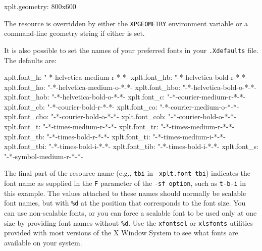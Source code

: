 \documentclass{book}
\begin{document}
\begin{center}
\begin{boxedverbatim}
xplt.geometry: 800x600
\end{boxedverbatim}
\end{center}

The resource is overridden by either the {\tt XPGEOMETRY} environment
variable or a command-line geometry string if either is set.

%
It is also possible to set the names of your preferred fonts in your
{\tt .Xdefaults} file.  The defaults are:

\begin{center}
\begin{boxedverbatim}
xplt.font_h:    "-*-helvetica-medium-r-*-*-%
xplt.font_hb:   "-*-helvetica-bold-r-*-*-%
xplt.font_ho:   "-*-helvetica-medium-o-*-*-%
xplt.font_hbo:  "-*-helvetica-bold-o-*-*-%
xplt.font_hob:  "-*-helvetica-bold-o-*-*-%
xplt.font_c:    "-*-courier-medium-r-*-*-%
xplt.font_cb:   "-*-courier-bold-r-*-*-%
xplt.font_co:   "-*-courier-medium-o-*-*-%
xplt.font_cbo:  "-*-courier-bold-o-*-*-%
xplt.font_cob:  "-*-courier-bold-o-*-*-%
xplt.font_t:    "-*-times-medium-r-*-*-%
xplt.font_tr:   "-*-times-medium-r-*-*-%
xplt.font_tb:   "-*-times-bold-r-*-*-%
xplt.font_ti:   "-*-times-medium-i-*-*-%
xplt.font_tbi:  "-*-times-bold-i-*-*-%
xplt.font_tib:  "-*-times-bold-i-*-*-%
xplt.font_s:    "-*-symbol-medium-r-*-*-%
\end{boxedverbatim}
\end{center}

%
%
The final part of the resource name (e.g., {\tt tbi} in {\tt
xplt.font\_tbi}) indicates the font name as supplied in the {\tt F}
parameter of the {\tt -sf option}, such as {\tt t-b-i} in this
example.  The values attached to these names should normally be
scalable font names, but with {\tt \%d} at the position that
corresponds to the font size.  You can use non-scalable fonts,
or you can force a scalable font to be used only at one size by
providing font names without {\tt \%d}.  Use the {\tt xfontsel}
or {\tt xlsfonts} utilities provided with most versions of the X
Window System to see what fonts are available on your system.
\end{document}
